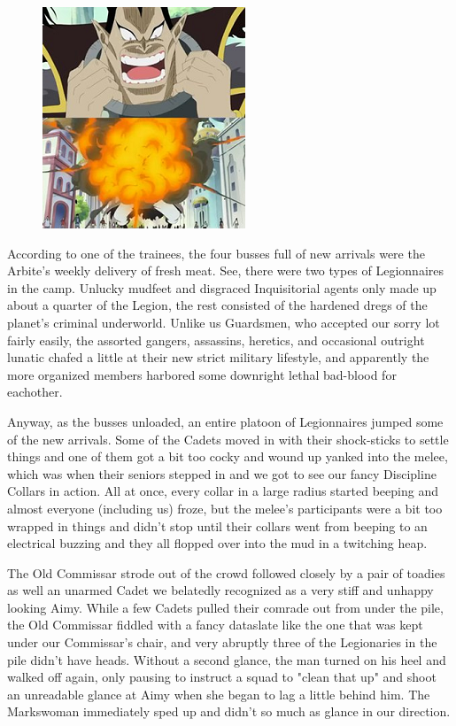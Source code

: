 \begin{figure}
	\begin{center}
		\includegraphics[width=\figwidth]{pics/21/19.png}
	\end{center}
\end{figure}
According to one of the trainees, the four busses full of new arrivals were the Arbite's weekly delivery of fresh meat. 
See, there were two types of Legionnaires in the camp. 
Unlucky mudfeet and disgraced Inquisitorial agents only made up about a quarter of the Legion, the rest consisted of the hardened dregs of the planet's criminal underworld. 
Unlike us Guardsmen, who accepted our sorry lot fairly easily, the assorted gangers, assassins, heretics, and occasional outright lunatic chafed a little at their new strict military lifestyle, and apparently the more organized members harbored some downright lethal bad-blood for eachother.

Anyway, as the busses unloaded, an entire platoon of Legionnaires jumped some of the new arrivals. 
Some of the Cadets moved in with their shock-sticks to settle things and one of them got a bit too cocky and wound up yanked into the melee, which was when their seniors stepped in and we got to see our fancy Discipline Collars in action. 
All at once, every collar in a large radius started beeping and almost everyone (including us) froze, but the melee's participants were a bit too wrapped in things and didn't stop until their collars went from beeping to an electrical buzzing and they all flopped over into the mud in a twitching heap. 


The Old Commissar strode out of the crowd followed closely by a pair of toadies as well an unarmed Cadet we belatedly recognized as a very stiff and unhappy looking Aimy. 
While a few Cadets pulled their comrade out from under the pile, the Old Commissar fiddled with a fancy dataslate like the one that was kept under our Commissar's chair, and very abruptly three of the Legionaries in the pile didn't have heads. 
Without a second glance, the man turned on his heel and walked off again, only pausing to instruct a squad to "clean that up" and shoot an unreadable glance at Aimy when she began to lag a little behind him. 
The Markswoman immediately sped up and didn't so much as glance in our direction.

